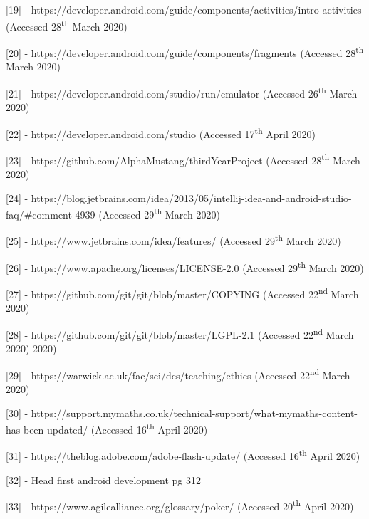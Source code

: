 \documentclass{article}
\begin{document}
[19] - https://developer.android.com/guide/components/activities/intro-activities (Accessed 28\textsuperscript{th} March 2020) \par

[20] - https://developer.android.com/guide/components/fragments (Accessed 28\textsuperscript{th} March 2020) \par

[21] - https://developer.android.com/studio/run/emulator (Accessed 26\textsuperscript{th} March 2020) \par

[22] - https://developer.android.com/studio (Accessed 17\textsuperscript{th} April 2020) \par

[23] - https://github.com/AlphaMustang/thirdYearProject (Accessed 28\textsuperscript{th} March 2020) \par

[24] - https://blog.jetbrains.com/idea/2013/05/intellij-idea-and-android-studio-faq/\#comment-4939 (Accessed 29\textsuperscript{th} March 2020) \par

[25] - https://www.jetbrains.com/idea/features/ (Accessed 29\textsuperscript{th} March 2020) \par

[26] - https://www.apache.org/licenses/LICENSE-2.0 (Accessed 29\textsuperscript{th} March 2020) \par

[27] - https://github.com/git/git/blob/master/COPYING (Accessed 22\textsuperscript{nd} March 2020) \par

[28] - https://github.com/git/git/blob/master/LGPL-2.1 (Accessed 22\textsuperscript{nd} March 2020) 2020) \par

[29] - https://warwick.ac.uk/fac/sci/dcs/teaching/ethics (Accessed 22\textsuperscript{nd} March 2020) \par

[30] - https://support.mymaths.co.uk/technical-support/what-mymaths-content-has-been-updated/ (Accessed 16\textsuperscript{th} April 2020) \par

[31] - https://theblog.adobe.com/adobe-flash-update/ (Accessed 16\textsuperscript{th} April 2020) \par

[32] - Head first android development pg 312

[33] - https://www.agilealliance.org/glossary/poker/ (Accessed 20\textsuperscript{th} April 2020)
\end{document}
